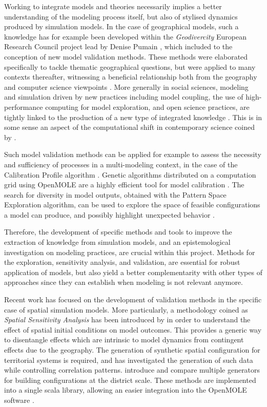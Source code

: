 Working to integrate models and theories necessarily implies a better understanding of the modeling process itself, but also of stylised dynamics produced by simulation models. In the case of geographical models, such a knowledge has for example been developed within the \emph{Geodivercity} European Research Council project lead by Denise Pumain \cite{pumain2017urban}, which included to the conception of new model validation methods. These methods were elaborated specifically to tackle thematic geographical questions, but were applied to many contexts thereafter, witnessing a beneficial relationship both from the geography and computer science viewpoints \cite{raimbault2019methods}. More generally in social sciences, modeling and simulation driven by new practices including model coupling, the use of high-performance computing for model exploration, and open science practices, are tightly linked to the production of a new type of integrated knowledge \cite{banos2013pour}. This is in some sense an aspect of the computational shift in contemporary science coined by \cite{arthur2014complexity}.


Such model validation methods can be applied for example to assess the necessity and sufficiency of processes in a multi-modeling context, in the case of the Calibration Profile algorithm \cite{reuillon2015new}. Genetic algorithms distributed on a computation grid using OpenMOLE are a highly efficient tool for model calibration \cite{schmitt2015half}. The search for diversity in model outputs, obtained with the Pattern Space Exploration algorithm, can be used to explore the space of feasible configurations a model can produce, and possibly highlight unexpected behavior \cite{cherel2015beyond}.


Therefore, the development of specific methods and tools to improve the extraction of knowledge from simulation models, and an epistemological investigation on modeling practices, are crucial within this project. Methods for the exploration, sensitivity analysis, and validation, are essential for robust application of models, but also yield a better complementarity with other types of approaches since they can establish when modeling is not relevant anymore.

Recent work has focused on the development of validation methods in the specific case of spatial simulation models. More particularly, a methodology coined as \emph{Spatial Sensitivity Analysis} has been introduced by \cite{raimbault2019space} in order to understand the effect of spatial initial conditions on model outcomes. This provides a generic way to disentangle effects which are intrinsic to model dynamics from contingent effects due to the geography. The generation of synthetic spatial configuration for territorial systems is required, and \cite{raimbault2019second} has investigated the generation of such data while controlling correlation patterns. \cite{raimbault2019generating} introduce and compare multiple generators for building configurations at the district scale. These methods are implemented into a single scala library, allowing an easier integration into the OpenMOLE software \cite{raimbault2020scala}.



